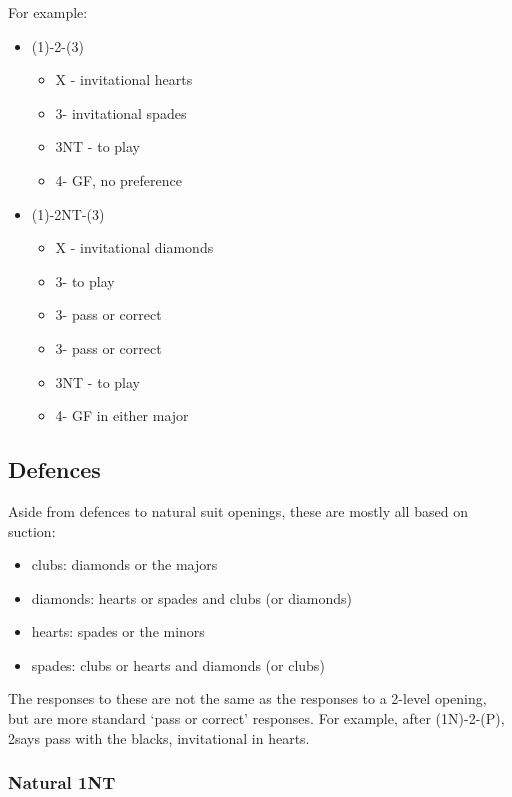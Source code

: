 \documentclass[a4paper,14pt]{extarticle}
\begin{document}
\newpage

For example:

\begin{itemize}
\item (1\clubs)-2\clubs-(3\clubs)
	\begin{itemize}
	\item X - invitational hearts
	\item 3\diamonds - invitational spades
	\item 3NT - to play
	\item 4\clubs - GF, no preference
	\end{itemize}
\item (1\clubs)-2NT-(3\clubs)
	\begin{itemize}
	\item X - invitational diamonds
	\item 3\diamonds - to play
	\item 3\hearts - pass or correct
	\item 3\spades - pass or correct
	\item 3NT - to play
	\item 4\clubs - GF in either major
	\end{itemize}
\end{itemize}

\subsection{Defences}
\label{sec:defences}

Aside from defences to natural suit openings, these are mostly all based on suction:

\begin{itemize}
\item clubs: diamonds or the majors
\item diamonds: hearts or spades and clubs (or diamonds)
\item hearts: spades or the minors
\item spades: clubs or hearts and diamonds (or clubs)
\end{itemize}

The responses to these are not the same as the responses to a 2-level opening,
but are more standard `pass or correct' responses. For example, after
(1N)-2\diamonds-(P), 2\spades says pass with the blacks, invitational
in hearts.

\subsubsection{Natural 1NT}
\label{sec:def:1n}
\end{document}
